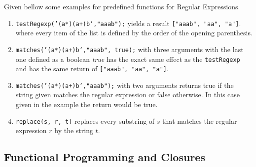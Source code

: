 \documentclass[11pt]{article}
\begin{document}
Given bellow some examples for predefined functions for Regular Expressions.
\begin{enumerate}
\item \texttt{testRegexp('(a*)(a+)b',"aaab");} yields a result \texttt{["aaab", "aa", "a"]}. where every item of the list is defined by the order of the opening parenthesis.
\item \texttt{matches('(a*)(a+)b',"aaab", true);} with three arguments with the last one defined as a boolean \textsl{true} has the exact same effect as the \texttt{testRegexp} and has the same return of \texttt{["aaab", "aa", "a"]}.
\item \texttt{matches('(a*)(a+)b',"aaab");} with two arguments returns true if the string given matches the regular expression or false otherwise. In this case given in the example the return would be true.
\item \texttt{replace(s, r, t)} replaces every substring of $s$ that matches the regular expression $r$ by the string $t$.
\end{enumerate}


\subsection{Functional Programming and Closures}
\end{document}
